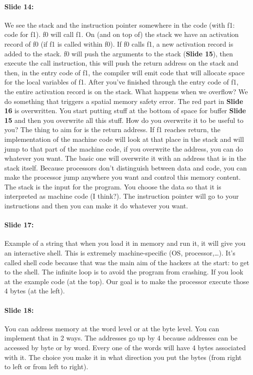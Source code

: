 \documentclass[10pt,a4paper]{report}
\begin{document}
\paragraph{Slide 14:} We see the stack and the instruction pointer somewhere in the code (with f1: code for f1). f0 will call f1. On (and on top of) the stack we have an activation record of f0 (if f1 is called within f0). If f0 calls f1, a new activation record is added to the stack. f0 will push the arguments to the stack (\textbf{Slide 15}), then execute the call instruction, this will push the return address on the stack and then, in the entry code of f1, the compiler will emit code that will allocate space for the local variables of f1. After you've finished through the entry code of f1, the entire activation record is on the stack. 
What happens when we overflow? We do something that triggers a spatial memory safety error. The red part in \textbf{Slide 16} is overwritten. You start putting stuff at the bottom of space for buffer \textbf{Slide 15} and then you overwrite all this stuff. How do you overwrite it to be useful to you? The thing to aim for is the return address. If f1 reaches return, the implementation of the machine code will look at that place in the stack and will jump to that part of the machine code, if you overwrite the address, you can do whatever you want. The basic one will overwrite it with an address that is in the stack itself. Because processors don't distinguish between data and code, you can make the processor jump anywhere you want and control this memory content. The stack is the input for the program. You choose the data so that it is interpreted as machine code (I think?). The instruction pointer will go to your instructions and then you can make it do whatever you want.

\paragraph{Slide 17:} Example of a string that when you load it in memory and run it, it will give you an interactive shell. This is extremely machine-specific (OS, processor,…). It's called shell code because that was the main aim of the hackers at the start: to get to the shell.
The infinite loop is to avoid the program from crashing. If you look at the example code (at the top). Our goal is to make the processor execute those 4 bytes (at the left).

\paragraph{Slide 18:} You can address memory at the word level or at the byte level. You can implement that in 2 ways. The addresses go up by 4 because addresses can be accessed by byte or by word. Every one of the words will have 4 bytes associated with it. The choice you make it in what direction you put the bytes (from right to left or from left to right).
\end{document}
